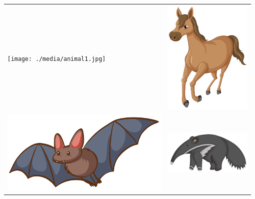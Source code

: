 \begin{table}[H]
\centering
\begin{tabular}{ll}
\texttt{[image: ./media/animal1.jpg]} & \includegraphics[width=.5\textwidth]{./media/animal2.jpg} \\
\includegraphics[width=.5\textwidth]{./media/animal3.jpg}  & \includegraphics[width=.5\textwidth]{./media/animal4.png}
\end{tabular}
\end{table}



 
